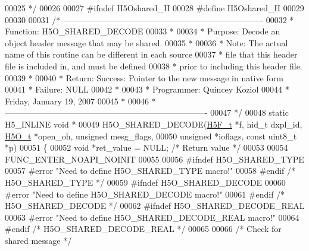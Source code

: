 \begin{DoxyCode}
00025 \textcolor{comment}{ */}
00026 
00027 \textcolor{preprocessor}{#ifndef H5Oshared\_H}
00028 \textcolor{preprocessor}{#define H5Oshared\_H}
00029 
00030 
00031 \textcolor{comment}{/*-------------------------------------------------------------------------}
00032 \textcolor{comment}{ * Function:    H5O\_SHARED\_DECODE}
00033 \textcolor{comment}{ *}
00034 \textcolor{comment}{ * Purpose:     Decode an object header message that may be shared.}
00035 \textcolor{comment}{ *}
00036 \textcolor{comment}{ * Note:    The actual name of this routine can be different in each source}
00037 \textcolor{comment}{ *      file that this header file is included in, and must be defined}
00038 \textcolor{comment}{ *      prior to including this header file.}
00039 \textcolor{comment}{ *}
00040 \textcolor{comment}{ * Return:      Success:        Pointer to the new message in native form}
00041 \textcolor{comment}{ *              Failure:        NULL}
00042 \textcolor{comment}{ *}
00043 \textcolor{comment}{ * Programmer:  Quincey Koziol}
00044 \textcolor{comment}{ *              Friday, January 19, 2007}
00045 \textcolor{comment}{ *}
00046 \textcolor{comment}{ *-------------------------------------------------------------------------}
00047 \textcolor{comment}{ */}
00048 \textcolor{keyword}{static} H5\_INLINE \textcolor{keywordtype}{void} *
00049 H5O\_SHARED\_DECODE(\hyperlink{struct_h5_f__t}{H5F\_t} *f, hid\_t dxpl\_id, \hyperlink{struct_h5_o__t}{H5O\_t} *open\_oh, \textcolor{keywordtype}{unsigned} mesg\_flags,
00050     \textcolor{keywordtype}{unsigned} *ioflags, \textcolor{keyword}{const} uint8\_t *p)
00051 \{
00052     \textcolor{keywordtype}{void} *ret\_value = NULL;     \textcolor{comment}{/* Return value */}
00053 
00054     FUNC\_ENTER\_NOAPI\_NOINIT
00055 
00056 \textcolor{preprocessor}{#ifndef H5O\_SHARED\_TYPE}
00057 \textcolor{preprocessor}{#error "Need to define H5O\_SHARED\_TYPE macro!"}
00058 \textcolor{preprocessor}{#endif }\textcolor{comment}{/* H5O\_SHARED\_TYPE */}\textcolor{preprocessor}{}
00059 \textcolor{preprocessor}{#ifndef H5O\_SHARED\_DECODE}
00060 \textcolor{preprocessor}{#error "Need to define H5O\_SHARED\_DECODE macro!"}
00061 \textcolor{preprocessor}{#endif }\textcolor{comment}{/* H5O\_SHARED\_DECODE */}\textcolor{preprocessor}{}
00062 \textcolor{preprocessor}{#ifndef H5O\_SHARED\_DECODE\_REAL}
00063 \textcolor{preprocessor}{#error "Need to define H5O\_SHARED\_DECODE\_REAL macro!"}
00064 \textcolor{preprocessor}{#endif }\textcolor{comment}{/* H5O\_SHARED\_DECODE\_REAL */}\textcolor{preprocessor}{}
00065 
00066     \textcolor{comment}{/* Check for shared message */}

\end{DoxyCode}
